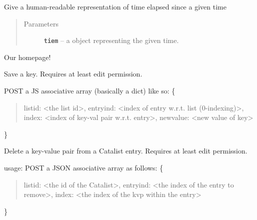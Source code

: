 \documentclass[letterpaper,10pt,english]{sphinxmanual}
\begin{document}

\begin{fulllineitems}
\label{index:routes.human_readable_time_since}
Give a human-readable representation of time elapsed since a given time
\begin{quote}\begin{description}
\item[{Parameters}] \leavevmode
\textbf{\texttt{tiem}} -- a  object representing the given time.

\end{description}\end{quote}

\end{fulllineitems}


\begin{fulllineitems}
\label{index:routes.index}
Our homepage!

\end{fulllineitems}


\begin{fulllineitems}
\label{index:routes.key_save}
Save a key. Requires at least edit permission.

POST a JS associative array (basically a dict) like so:
\{
\begin{quote}

listid:  \textless{}the list id\textgreater{},
entryind: \textless{}index of entry w.r.t. list (0-indexing)\textgreater{},
index: \textless{}index of key-val pair w.r.t. entry\textgreater{},
newvalue: \textless{}new value of key\textgreater{}
\end{quote}

\}

\end{fulllineitems}


\begin{fulllineitems}
\label{index:routes.kvp_delete}
Delete a key-value pair from a Catalist entry.
Requires at least edit permission.

usage: POST a JSON associative array as follows:
\{
\begin{quote}

listid: \textless{}the id of the Catalist\textgreater{},
entryind: \textless{}the index of the entry to remove\textgreater{},
index: \textless{}the index of the kvp within the entry\textgreater{}
\end{quote}

\}

\end{fulllineitems}
\end{document}
